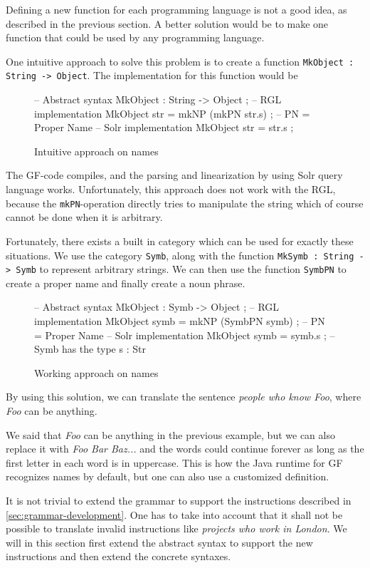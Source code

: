 Defining a new function for each programming language is not a good idea, as described in the previous section. A better solution would be to make one function that could be used by any programming language.

One intuitive approach to solve this problem is to create a function \texttt{MkObject : String -> Object}. The implementation for this function would be 
\begin{figure}[H]
\begin{code}
-- Abstract syntax
MkObject : String -> Object ;
-- RGL implementation
MkObject str = mkNP (mkPN str.s) ; -- PN = Proper Name
-- Solr implementation
MkObject str = str.s ;
\end{code}
\caption{Intuitive approach on names}
\end{figure}

The GF-code compiles, and the parsing and linearization by using Solr query language works. Unfortunately, this approach does not work with the RGL, because the \texttt{mkPN}-operation directly tries to manipulate the string which of course cannot be done when it is arbitrary.

Fortunately, there exists a built in category which can be used for exactly these situations. We use the category \texttt{Symb}, along with the function \texttt{MkSymb : String -> Symb} to represent arbitrary strings. We can then use the function \texttt{SymbPN} to create a proper name and finally create a noun phrase.
\begin{figure}[H]
\begin{code}
-- Abstract syntax
MkObject : Symb -> Object ;
-- RGL implementation
MkObject symb = mkNP (SymbPN symb) ; -- PN = Proper Name
-- Solr implementation
MkObject symb = symb.s ; -- Symb has the type { s : Str }
\end{code}
\caption{Working approach on names}
\end{figure}

By using this solution, we can translate the sentence \emph{people who know Foo}, where \emph{Foo} can be anything.

We said that \emph{Foo} can be anything in the previous example, but we can also replace it with \emph{Foo Bar Baz...} and the words could continue forever as long as the first letter in each word is in uppercase. This is how the Java runtime for GF recognizes names by default, but one can also use a customized definition.

It is not trivial to extend the grammar to support the instructions described in \autoref{sec:grammar-development}. One has to take into account that it shall not be possible to translate invalid instructions like \emph{projects who work in London}. We will in this section first extend the abstract syntax to support the new instructions and then extend the concrete syntaxes.

